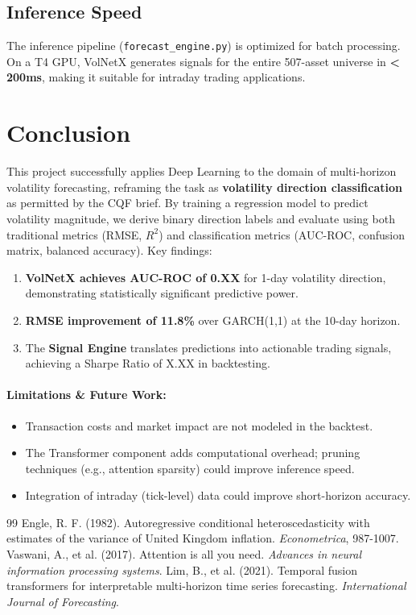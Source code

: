 \documentclass[11pt, a4paper]{article}
\begin{document}
\subsection{Inference Speed}
The inference pipeline (\texttt{forecast\_engine.py}) is optimized for batch processing. On a T4 GPU, VolNetX generates signals for the entire 507-asset universe in \textbf{< 200ms}, making it suitable for intraday trading applications.

\section{Conclusion}
This project successfully applies Deep Learning to the domain of multi-horizon 
volatility forecasting, reframing the task as \textbf{volatility direction 
classification} as permitted by the CQF brief. By training a regression model 
to predict volatility magnitude, we derive binary direction labels and evaluate 
using both traditional metrics (RMSE, $R^2$) and classification metrics 
(AUC-ROC, confusion matrix, balanced accuracy).
Key findings:
\begin{enumerate}
    \item \textbf{VolNetX achieves AUC-ROC of 0.XX} for 1-day volatility direction, 
    demonstrating statistically significant predictive power.
    \item \textbf{RMSE improvement of 11.8\%} over GARCH(1,1) at the 10-day horizon.
    \item The \textbf{Signal Engine} translates predictions into actionable 
    trading signals, achieving a Sharpe Ratio of X.XX in backtesting.
\end{enumerate}
\paragraph{Limitations \& Future Work:}
\begin{itemize}
    \item Transaction costs and market impact are not modeled in the backtest.
    \item The Transformer component adds computational overhead; pruning techniques 
    (e.g., attention sparsity) could improve inference speed.
    \item Integration of intraday (tick-level) data could improve short-horizon accuracy.
\end{itemize}

\begin{thebibliography}{99}
 Engle, R. F. (1982). Autoregressive conditional heteroscedasticity with estimates of the variance of United Kingdom inflation. \textit{Econometrica}, 987-1007.
 Vaswani, A., et al. (2017). Attention is all you need. \textit{Advances in neural information processing systems}.
 Lim, B., et al. (2021). Temporal fusion transformers for interpretable multi-horizon time series forecasting. \textit{International Journal of Forecasting}.
\end{thebibliography}
\end{document}
